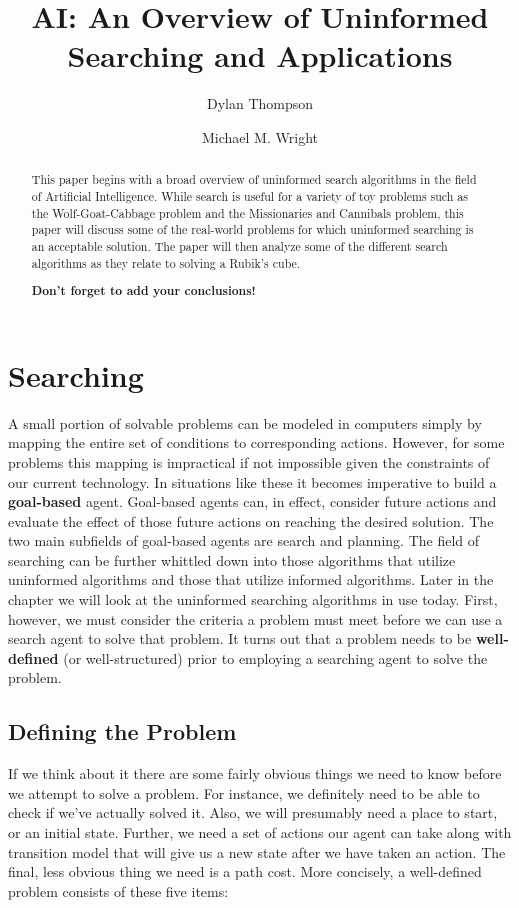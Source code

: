 \documentclass[a4paper,11pt]{report}
\title{AI: An Overview of Uninformed Searching and Applications}
\author{Dylan Thompson \and Michael M. Wright}
\begin{document}
\maketitle
\tableofcontents

\begin{abstract}
This paper begins with a broad overview of uninformed search algorithms in the 
field of Artificial Intelligence.  While search is useful for a variety of toy 
problems such as the Wolf-Goat-Cabbage problem and the Missionaries and
Cannibals problem, this paper will discuss some of the real-world problems
for which uninformed searching is an acceptable solution.  The paper will then 
analyze some of the different search algorithms as they relate to solving a 
Rubik's cube.

\textbf{Don't forget to add your conclusions!}

\end{abstract}

\chapter{Searching}
A small portion of solvable problems can be modeled in computers simply by
mapping the entire set of conditions to corresponding actions.  However, for
some problems this mapping is impractical if not impossible given the
constraints of our current technology.  In situations like these it becomes
imperative to build a \textbf{goal-based} agent.  Goal-based agents can, in
effect, consider future actions and evaluate the effect of those future
actions on reaching the desired solution.\cite{norvig}  The two main
subfields of goal-based agents are search and planning.\cite{wikiAgent} The
field of searching can be further whittled down into those algorithms that
utilize uninformed algorithms and those that utilize informed algorithms.
Later in the chapter we will look at the uninformed searching algorithms in
use today.  First, however, we must consider the criteria a problem must meet
before we can use a search agent to solve that problem.  It turns out that a
problem needs to be \textbf{well-defined} (or well-structured) prior to 
employing a searching agent to solve the problem.\cite{shun}

\section{Defining the Problem}
If we think about it there are some fairly obvious things we need to know
before we attempt to solve a problem.  For instance, we definitely need to be
able to check if we've actually solved it.  Also, we will presumably need a
place to start, or an initial state. Further, we need a set of actions our 
agent can take along with transition model that will give us a new state after
we have taken an action.  The final, less obvious thing we need is a path cost.
\cite{norvig}  More concisely, a well-defined problem consists of these
five items:
\end{document}
